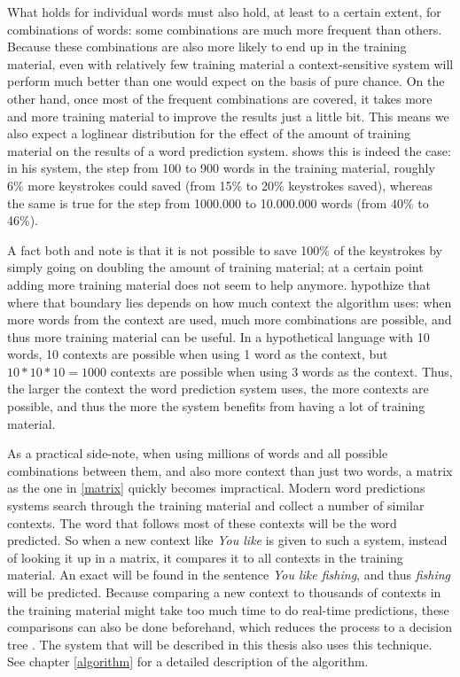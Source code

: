 \documentclass[12pt]{article}
\begin{document}
What holds for individual words must also hold, at least to a certain extent, for combinations of words: some combinations are much more frequent than others. Because these combinations are also more likely to end up in the training material, even with relatively few training material a context-sensitive system will perform much better than one would expect on the basis of pure chance. On the other hand, once most of the frequent combinations are covered, it takes more and more training material to improve the results just a little bit. This means we also expect a loglinear distribution for the effect of the amount of training material on the results of a word prediction system.  shows this is indeed the case: in his system, the step from 100 to 900 words in the training material, roughly 6\% more keystrokes could saved (from 15\% to 20\% keystrokes saved), whereas the same is true for the step from 1000.000 to 10.000.000 words (from 40\% to 46\%).

A fact both  and  note is that it is not possible to save 100\% of the keystrokes by simply going on doubling the amount of training material; at a certain point adding more training material does not seem to help anymore.  hypothize that where that boundary lies depends on how much context the algorithm uses: when more words from the context are used, much more combinations are possible, and thus more training material can be useful. In a hypothetical language with 10 words, 10 contexts are possible when using 1 word as the context, but $10*10*10 = 1000$ contexts are possible when using 3 words as the context. Thus, the larger the context the word prediction system uses, the more contexts are possible, and thus the more the system benefits from having a lot of training material.

As a practical side-note, when using millions of words and all possible combinations between them, and also more context than just two words, a matrix as the one in \ref{matrix} quickly becomes impractical. Modern word predictions systems search through the training material and collect a number of similar contexts. The word that follows most of these contexts will be the word predicted. So when a new context like \emph{You like} is given to such a system, instead of looking it up in a matrix, it compares it to all contexts in the training material. An exact will be found in the sentence \emph{You like fishing}, and thus \emph{fishing} will be predicted. Because comparing a new context to thousands of contexts in the training material might take too much time to do real-time predictions, these comparisons can also be done beforehand, which reduces the process to a decision tree . The system that will be described in this thesis also uses this technique. See chapter \ref{algorithm} for a detailed description of the algorithm.
\end{document}
